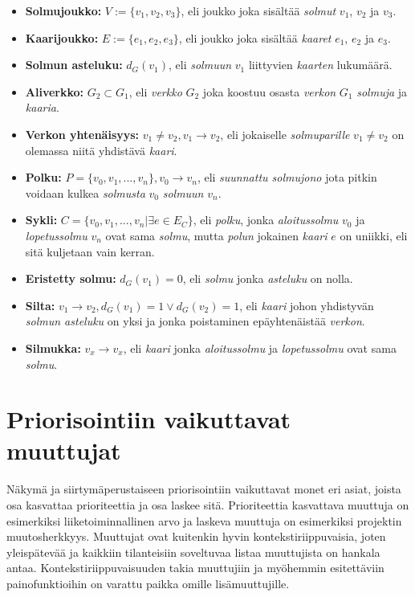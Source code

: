   \begin{itemize}
    \item \textbf{Solmujoukko:} \(V := \{v_1, v_2, v_3\}\), eli joukko joka sisältää \emph{solmut} \(v_1\), \(v_2\) ja \(v_3\).
    \item \textbf{Kaarijoukko:} \(E := \{e_1, e_2, e_3\}\), eli joukko joka sisältää \emph{kaaret} \(e_1\), \(e_2\) ja \(e_3\).
    \item \textbf{Solmun asteluku:} \(d_G(v_1)\), eli \emph{solmuun} \(v_1\) liittyvien \emph{kaarten} lukumäärä.
    \item \textbf{Aliverkko:} \(G_2 \subset G_1\), eli \emph{verkko} \(G_2\) joka koostuu osasta \emph{verkon} \(G_1\) \emph{solmuja} ja \emph{kaaria}.
    \item \textbf{Verkon yhtenäisyys:} \(v_1 \neq v_2, v_1 \rightarrow v_2\), eli jokaiselle \emph{solmuparille} \(v_1 \neq v_2\) on olemassa niitä yhdistävä \emph{kaari}.
    \item \textbf{Polku:} \(P = \{v_0, v_1, ..., v_n\}, v_0 \rightarrow v_n\), eli \emph{suunnattu solmujono} jota pitkin voidaan kulkea \emph{solmusta} \(v_0\) \emph{solmuun} \(v_n\).
    \item \textbf{Sykli:} \(C = \{v_0, v_1, ..., v_n| \exists e \in E_C\}\), eli \emph{polku}, jonka \emph{aloitussolmu} \(v_0\) ja \emph{lopetussolmu} \(v_n\) ovat sama \emph{solmu}, mutta \emph{polun} jokainen \emph{kaari} \(e\) on uniikki, eli sitä kuljetaan vain kerran.
    \item \textbf{Eristetty solmu:} \(d_G(v_1) = 0\), eli \emph{solmu} jonka \emph{asteluku} on nolla.
    \item \textbf{Silta:} \(v_1 \rightarrow v_2, d_G(v_1) = 1 \lor d_G(v_2) = 1\), eli \emph{kaari} johon yhdistyvän \emph{solmun asteluku} on yksi ja jonka poistaminen epäyhtenäistää \emph{verkon}.
    \item \textbf{Silmukka:} \(v_x \rightarrow v_x\), eli \emph{kaari} jonka \emph{aloitussolmu} ja \emph{lopetussolmu} ovat sama \emph{solmu}.
  \end{itemize}

\section{Priorisointiin vaikuttavat muuttujat} \label{ch:10_priorisointiin_vaikuttavat_muuttujat}

  Näkymä ja siirtymäperustaiseen priorisointiin vaikuttavat monet eri asiat, joista osa kasvattaa prioriteettia ja osa laskee sitä.
  Prioriteettia kasvattava muuttuja on esimerkiksi liiketoiminnallinen arvo ja laskeva muuttuja on esimerkiksi projektin muutosherkkyys.
  Muuttujat ovat kuitenkin hyvin kontekstiriippuvaisia, joten yleispätevää ja kaikkiin tilanteisiin soveltuvaa listaa muuttujista on hankala antaa.
  Kontekstiriippuvaisuuden takia muuttujiin ja myöhemmin esitettäviin painofunktioihin on varattu paikka omille lisämuuttujille.

